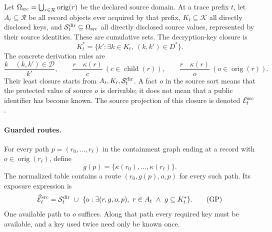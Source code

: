 Let $\Omega_{\rm src}=\bigcup_{r\in\mathcal R}\operatorname{orig}(r)$ be the
declared source domain.  At a trace prefix $t$, let $A_t\subseteq\mathcal R$ be all record objects
ever acquired by that prefix, $K_t\subseteq\mathcal K$ all directly
disclosed keys, and $\mathcal S^{\rm dir}_t\subseteq\Omega_{\rm src}$ all directly disclosed source values, represented
by their source identities.  These are cumulative sets.  The decryption-key
closure is
\[
  K_t^*=\{k':\exists k\in K_t,\ (k,k')\in D^*\}.
\]
The concrete derivation rules are
\[
 \frac{k\quad(k,k')\in\mathcal D}{k'},\qquad
 \frac{r\quad\kappa(r)}{c}\ (c\in\operatorname{child}(r)),\qquad
 \frac{r\quad\kappa(r)}{o}\ (o\in\operatorname{orig}(r)).
\]
Their least closure starts from $A_t,K_t,\mathcal S^{\rm dir}_t$.  A fact $o$ in the source
sort means that the protected value of source $o$ is derivable; it does
not mean that a public identifier has become known.  The source projection
of this closure is denoted $\mathcal E^{\rm src}_t$.

\paragraph{Guarded routes.}
For every path $p=(r_0,\ldots,r_\ell)$ in the containment graph ending
at a record with $o\in\operatorname{orig}(r_\ell)$, define
\[
 g(p)=\{\kappa(r_0),\ldots,\kappa(r_\ell)\}.
\]
The normalized table contains a route $(r_0,g(p),o,p)$ for every such
path.  Its exposure expression is
\[
 \widehat{\mathcal E}^{\rm src}_t=\mathcal S^{\rm dir}_t\ \cup\
 \{o:\exists(r,g,o,p),\ r\in A_t\ \land\ g\subseteq K_t^*\}.
 \tag{GP}
\]
One available path to $o$ suffices. Along that path every required
key must be available, and a key used twice need only be known once.

